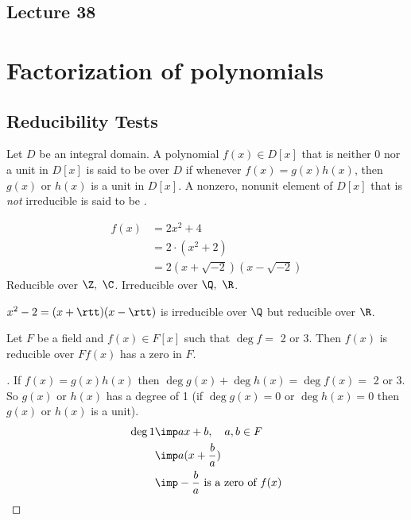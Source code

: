 \documentclass[a4paper]{article}
\begin{document}
\subsection*{Lecture 38} %
\section{Factorization of polynomials}
\subsection{Reducibility Tests}
\begin{definition}
  Let \( D \) be an integral domain.
  A polynomial \( f(x)\in D[x] \) that is neither 0 nor a unit in \( D[x] \) is said to be  over \( D \) if whenever \( f(x) = g(x)h(x) \), then \( g(x) \) or \( h(x) \) is a unit in \( D[x] \). A nonzero, nonunit element of \( D[x] \) that is \emph{not} irreducible is said to be .
\end{definition}

\begin{example}
  \begin{align*}
    f(x) &= 2x^2 + 4 \\ &= 2\cdot (x^2+2) \\ &= 2(x+\sqrt{-2})(x-\sqrt{-2})
  \end{align*}
  Reducible over \( \Z,\ \C \). Irreducible over \( \Q,\ \R \).
\end{example}

\begin{example}
  \( x^2-2 = (x+\rtt)(x-\rtt) \) is irreducible over \( \Q \) but reducible over \( \R \).
\end{example}

\begin{theorem}
  Let \( F \) be a field and \( f(x) \in F[x] \) such that \( \deg f =\) 2 or 3.
  Then \( f(x) \) is reducible over \( F \)\iff \( f(x) \) has a zero in \( F \).
\end{theorem}

\begin{proof}[]
  If \( f(x) = g(x)h(x) \) then \( \deg g(x) + \deg h(x) = \deg f(x) = \) 2 or 3.
  So \( g(x) \) or \( h(x) \) has a degree of 1 (if \( \deg g(x) = 0 \) or \( \deg h(x) = 0 \) then \( g(x) \) or \( h(x) \) is a unit).
  \begin{align*}
    \deg 1 &\imp ax+b,\quad a,b\in F \\
           &\imp a(x+\frac{b}{a}) \\
           &\imp -\frac{b}{a} \text{ is a zero of } f(x)
  \end{align*}
\end{proof}
\end{document}
